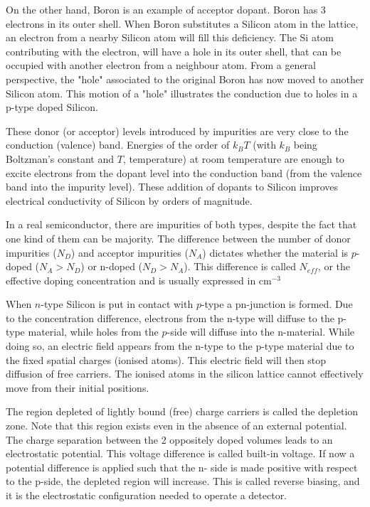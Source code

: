 On the other hand, Boron is an example of acceptor dopant. Boron has 3 electrons
in its outer shell. When Boron substitutes a Silicon atom in the
lattice, an electron from a nearby Silicon atom will fill this deficiency. The
Si atom contributing with the electron, will have a hole in its outer shell,
that can be occupied with another electron from a neighbour atom. From a general
perspective, the "hole" associated to the original Boron has now moved to
another Silicon atom. This motion of a "hole" illustrates the conduction due to
holes in a p-type doped Silicon.

These donor (or acceptor) levels introduced by impurities are very close to the
conduction (valence) band. Energies of the order of $k_B T$ (with $k_B$ being 
Boltzman's constant and $T$, temperature) at room temperature are enough to 
excite electrons from the dopant level into the conduction band (from the 
valence band into the impurity level). These addition of dopants to 
Silicon improves electrical conductivity of Silicon by orders of magnitude.  

In a real semiconductor, there are impurities of both types, despite the fact
that one kind of them can be majority. The difference between the number of
donor impurities ($N_D$) and acceptor impurities ($N_A$) dictates whether the
material is $p$-doped ($N_A > N_D $) or n-doped ($N_D > N_A$). This difference
is called $N_{eff}$, or the effective doping concentration and is usually 
expressed in cm$^{-3}$

When $n$-type Silicon is put in contact with $p$-type a pn-junction is formed.
Due to the concentration difference, electrons from the n-type will diffuse to
the p-type material, while holes from the $p$-side will diffuse into the
n-material. While doing so, an electric field appears from the n-type to the
p-type material due to the fixed spatial charges (ionised atoms). This electric
field will then stop diffusion of free carriers. The ionised atoms in the
silicon lattice cannot effectively move from their initial positions. 

The region depleted of lightly bound (free) charge carriers is called the  
depletion zone. Note that this region exists even in the absence of an 
external potential. The charge separation between the 2 oppositely doped 
volumes leads to an electrostatic potential. This voltage difference is called 
built-in voltage. If now a potential difference is applied such that the n-
side is made positive with respect to the p-side, the depleted region will 
increase. This is called reverse biasing, and it is the electrostatic 
configuration needed to  operate a detector. 

